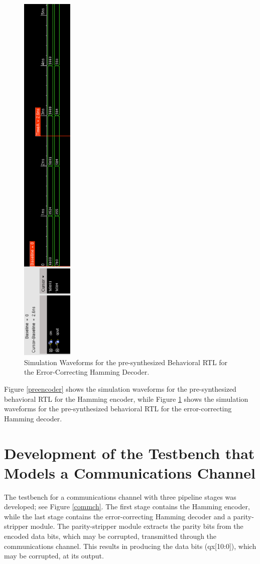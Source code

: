 \documentclass[ee577b,acmnow]{acmtrans2m}
\begin{document}
\hspace{-2cm}\begin{figure}
\begin{center}
\includegraphics[height=18.5cm]{predec}
\caption{Simulation Waveforms for the pre-synthesized Behavioral RTL for the Error-Correcting Hamming Decoder.}
\label{predecoder}
\end{center}
\end{figure}

Figure \ref{preencoder} shows the simulation waveforms for the
pre-synthesized behavioral RTL for the Hamming encoder, while
Figure \ref{predecoder} shows the simulation waveforms for the
pre-synthesized behavioral RTL for the error-correcting Hamming
decoder.


\section{Development of the Testbench that Models a Communications Channel}
The testbench for a communications channel with three pipeline stages was developed; see Figure \ref{commch}. The first stage contains the Hamming encoder, while the last stage contains the error-correcting Hamming decoder and a parity-stripper module. The parity-stripper module extracts the parity bits from the encoded data bits, which may be corrupted, transmitted through the communications channel. This results in producing the data bits (qx[10:0]), which may be corrupted, at its output. 
\end{document}

